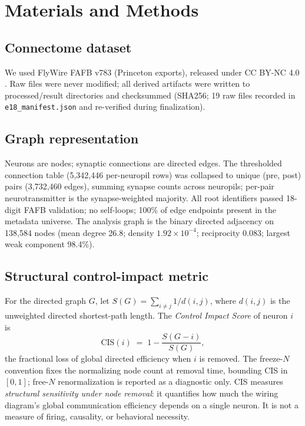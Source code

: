\section{Materials and Methods}

\subsection{Connectome dataset}
We used FlyWire FAFB v783 (Princeton exports), released under CC BY-NC
4.0 \cite{dorkenwald2024,schlegel2024}. Raw files were never modified; all
derived artifacts were written to processed/result directories and
checksummed (SHA256; 19 raw files recorded in
\texttt{e18\_manifest.json} and re-verified during finalization).

\subsection{Graph representation}
Neurons are nodes; synaptic connections are directed edges. The
thresholded connection table (5,342,446 per-neuropil rows) was collapsed
to unique (pre, post) pairs (3,732,460 edges), summing synapse counts
across neuropils; per-pair neurotransmitter is the synapse-weighted
majority. All root identifiers passed 18-digit FAFB validation; no
self-loops; 100\% of edge endpoints present in the metadata universe. The
analysis graph is the binary directed adjacency on 138,584 nodes (mean
degree 26.8; density $1.92\times10^{-4}$; reciprocity 0.083; largest weak
component 98.4\%).

\subsection{Structural control-impact metric}
For the directed graph $G$, let
$S(G)=\sum_{i\neq j} 1/d(i,j)$, where $d(i,j)$ is the unweighted directed
shortest-path length. The \emph{Control Impact Score} of neuron $i$ is
\[
\mathrm{CIS}(i) \;=\; 1 - \frac{S(G-i)}{S(G)},
\]
the fractional loss of global directed efficiency when $i$ is removed.
The freeze-$N$ convention fixes the normalizing node count at removal
time, bounding CIS in $[0,1]$; free-$N$ renormalization is reported as a
diagnostic only. CIS measures \emph{structural sensitivity under node
removal}: it quantifies how much the wiring diagram's global
communication efficiency depends on a single neuron. It is not a measure
of firing, causality, or behavioral necessity.

